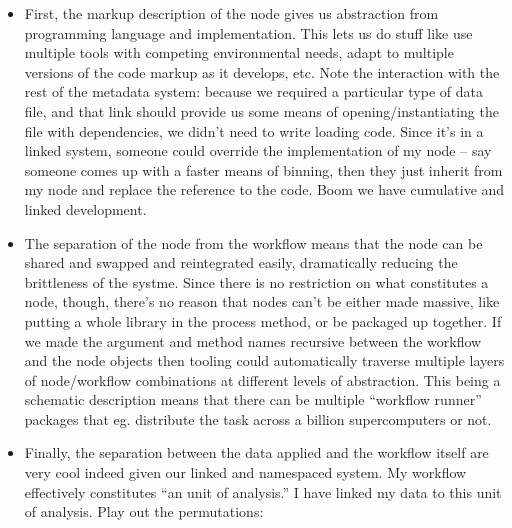\documentclass[10pt]{article}
\begin{document}
\begin{multicols}{2}
\begin{itemize}
\item
  First, the markup description of the node gives us abstraction from
  programming language and implementation. This lets us do stuff like
  use multiple tools with competing environmental needs, adapt to
  multiple versions of the code markup as it develops, etc. Note the
  interaction with the rest of the metadata system: because we required
  a particular type of data file, and that link should provide us some
  means of opening/instantiating the file with dependencies, we didn't
  need to write loading code. Since it's in a linked system, someone
  could override the implementation of my node -- say someone comes up
  with a faster means of binning, then they just inherit from my node
  and replace the reference to the code. Boom we have cumulative and
  linked development.
\item
  The separation of the node from the workflow means that the node can
  be shared and swapped and reintegrated easily, dramatically reducing
  the brittleness of the systme. Since there is no restriction on what
  constitutes a node, though, there's no reason that nodes can't be
  either made massive, like putting a whole library in the process
  method, or be packaged up together. If we made the argument and method
  names recursive between the workflow and the node objects then tooling
  could automatically traverse multiple layers of node/workflow
  combinations at different levels of abstraction. This being a
  schematic description means that there can be multiple ``workflow
  runner'' packages that eg. distribute the task across a billion
  supercomputers or not.
\item
  Finally, the separation between the data applied and the workflow
  itself are very cool indeed given our linked and namespaced system. My
  workflow effectively constitutes ``an unit of analysis.'' I have
  linked my data to this unit of analysis. Play out the permutations:

  \begin{itemize}
  

\end{itemize}
\end{itemize}
\end{multicols}
\end{document}
